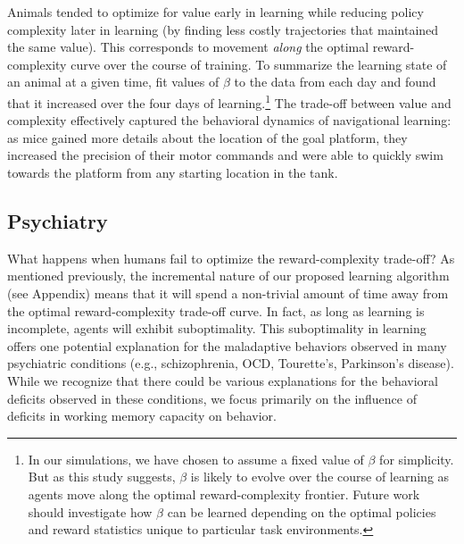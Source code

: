 \documentclass[11pt]{article}
\begin{document}
Animals tended to optimize for value early in learning while reducing policy complexity later in learning (by finding less costly trajectories that maintained the same value). This corresponds to movement \textit{along} the optimal reward-complexity curve over the course of training. To summarize the learning state of an animal at a given time, \cite{Amir2020-lm} fit values of $\beta$ to the data from each day and found that it increased over the four days of learning.\footnote{In our simulations, we have chosen to assume a fixed value of $\beta$ for simplicity. But as this study suggests, $\beta$ is likely to evolve over the course of learning as agents move along the optimal reward-complexity frontier. Future work should investigate how $\beta$ can be learned depending on the optimal policies and reward statistics unique to particular task environments.} The trade-off between value and complexity effectively captured the behavioral dynamics of navigational learning: as mice gained more details about the location of the goal platform, they increased the precision of their motor commands and were able to quickly swim towards the platform from any starting location in the tank. 

\subsection{Psychiatry}

What happens when humans fail to optimize the reward-complexity trade-off? As mentioned previously, the incremental nature of our proposed learning algorithm (see Appendix) means that it will spend a non-trivial amount of time away from the optimal reward-complexity trade-off curve. In fact, as long as learning is incomplete, agents will exhibit suboptimality. This suboptimality in learning offers one potential explanation for the maladaptive behaviors observed in many psychiatric conditions (e.g., schizophrenia, OCD, Tourette's, Parkinson's disease). While we recognize that there could be various explanations for the behavioral deficits observed in these conditions, we focus primarily on the influence of deficits in working memory capacity on behavior. 
\end{document}
